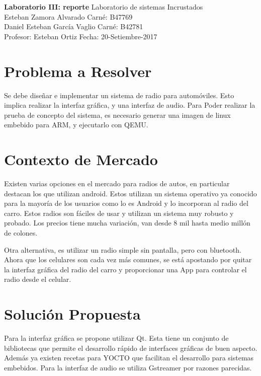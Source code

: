 

\noindent
\large\textbf{Laboratorio III: reporte} \hfill Laboratorio de sistemas Incrustados \\
\normalsize Esteban Zamora Alvarado \hfill Carné: B47769 \\
Daniel Esteban García Vaglio \hfill Carné: B42781 \\
Profesor: Esteban Ortiz  \hfill Fecha: 20-Setiembre-2017 \\

\section{Problema a Resolver}
\label{sec:Problem}
Se debe diseñar e implementar un sistema de radio para automóviles. Esto implica realizar la
interfaz gráfica, y una interfaz de audio. Para Poder realizar la prueba de concepto del sistema, es
necesario generar una imagen de linux embebido para ARM, y ejecutarlo con QEMU. 

\section{Contexto de Mercado}
\label{sec:Context}
Existen varias opciones en el mercado para radios de autos, en particular destacan los que utilizan
android. Estos utilizan un sistema operativo ya conocido para la mayoría de los usuarios como lo es
Android y lo incorporan al radio del carro. Estos radios son fáciles de usar y utilizan un sistema
muy robusto y probado. Los precios tiene mucha variación, van desde 8 mil hasta medio millón de
colones.

Otra alternativa, es utilizar un radio simple sin pantalla, pero con bluetooth. Ahora que los
celulares son cada vez más comunes, se está apostando por quitar la interfaz gráfica del radio del
carro y proporcionar una App para controlar el radio desde el celular.  


\section{Solución Propuesta}
\label{sec:solution}
Para la interfaz gráfica se propone utilizar Qt. Esta tiene un conjunto de bibliotecas que permite
el desarrollo rápido de interfaces gráficas de buen aspecto. Además ya existen recetas para YOCTO
que facilitan el desarrollo para sistemas embebidos. Para la interfaz de audio se utiliza Gstreamer
por razones parecidas.

